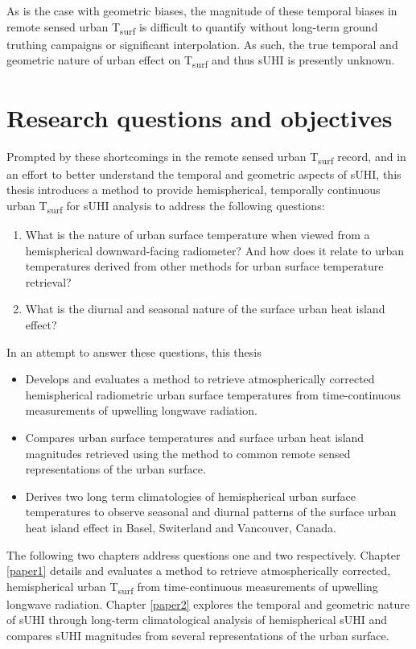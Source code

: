 \begin{bibunit}
As is the case with geometric biases, the magnitude of these temporal biases in remote sensed urban T\textsubscript{surf} is difficult to quantify without long-term ground truthing campaigns or significant interpolation. As such, the true temporal and geometric nature of urban effect on T\textsubscript{surf} and thus sUHI is presently unknown.
 
\section{Research questions and objectives}

Prompted by these shortcomings in the remote sensed urban T\textsubscript{surf} record, and in an effort to better understand the temporal and geometric aspects of sUHI, this thesis introduces a method to provide hemispherical, temporally continuous urban T\textsubscript{surf} for sUHI analysis to address the following questions:

\begin{enumerate}
	\item What is the nature of urban surface temperature when viewed from a hemispherical downward-facing radiometer? And how does it relate to urban temperatures derived from other methods for urban surface temperature retrieval?
	\item What is the diurnal and seasonal nature of the surface urban heat island effect?
\end{enumerate}

\noindent In an attempt to answer these questions, this thesis

\begin{itemize}
	\item Develops and evaluates a method to retrieve atmospherically corrected hemispherical radiometric urban surface temperatures from time-continuous measurements of upwelling longwave radiation.
	\item Compares urban surface temperatures and surface urban heat island magnitudes retrieved using the method to common remote sensed representations of the urban surface.
	\item Derives two long term climatologies of hemispherical urban surface temperatures to observe seasonal and diurnal patterns of the surface urban heat island effect in Basel, Switerland and Vancouver, Canada.
\end{itemize}

The following two chapters address questions one and two respectively. Chapter \ref{paper1} details and evaluates a method to retrieve atmospherically corrected, hemispherical urban T\textsubscript{surf} from time-continuous measurements of upwelling longwave radiation. Chapter \ref{paper2} explores the temporal and geometric nature of sUHI through long-term climatological analysis of hemispherical sUHI and compares sUHI magnitudes from several representations of the urban surface.


\cleardoublepage 
{}  
\renewcommand*{\bibname}{References}

\putbib
\end{bibunit}